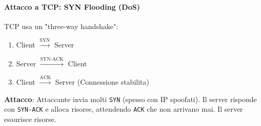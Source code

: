 \paragraph{Attacco a TCP: SYN Flooding (DoS)}
TCP usa un "three-way handshake":
\begin{enumerate}
    \item Client $\xrightarrow{\text{SYN}}$ Server
    \item Server $\xrightarrow{\text{SYN-ACK}}$ Client
    \item Client $\xrightarrow{\text{ACK}}$ Server (Connessione stabilita)
\end{enumerate}
\textbf{Attacco}: Attaccante invia molti \texttt{SYN} (spesso con IP spoofati). Il server risponde con \texttt{SYN-ACK} e alloca risorse, attendendo \texttt{ACK} che non arrivano mai. Il server esaurisce risorse.

